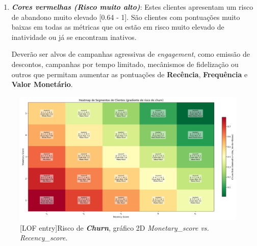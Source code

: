 \documentclass{easychair}
\begin{document}
\begin{enumerate}
	\item \textit{\textbf{Cores vermelhas (Risco muito alto)}}: Estes clientes apresentam um risco de abandono muito elevado [0.64 - 1].
São clientes com pontuações muito baixas em todas as métricas que ou estão em risco muito elevado de inatividade ou já se encontram inativos. 

Deverão ser alvos de campanhas agressivas de \textit{engagement}, como emissão de descontos, campanhas por tempo limitado, mecânismos de fidelização ou outros que permitam aumentar as pontuações de \textbf{Recência}, \textbf{Frequência} e  \textbf{Valor Monetário}.
\end{enumerate}

\begin{figure}[H]
    \begin{centering}
    \includegraphics[width=1\linewidth]{imagens/figure30.jpg}\label{cap-5-fig30}
    [LOF entry]{Risco de \textbf{\textit{Churn}}, gráfico 2D \textit{Monetary_score vs. Recency_score}.}
    \label{fig30}
    \end{centering}
\end{figure}
\end{document}
